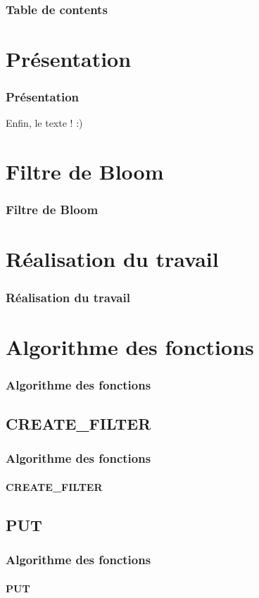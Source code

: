 \documentclass[hyperref={pdfpagemode=FullScreen,colorlinks=true},xcolor=pst,dvips]{beamer}\usepackage[french]{babel}
\title[]{\noindent\rule{\linewidth}{1pt}
		\large Recherche de filtres de Bloom similaires \\
		\large Application à la recherche par mots clés basée sur une DHT\\
		\noindent\rule{\linewidth}{1pt}
}
\author[NDOMBI TSHISUNGU \& DOAN]{\textbf{NDOMBI TSHISUNGU} Christian \& \textbf{DOAN} Cao Sang \\
			Encadrant: M. \textbf{MAKPANGOU} Mesaac, Regal}
\institute{UPMC}
\date{2 Mai 2015}
\begin{document}
	\begin{frame}
		\titlepage
	\end{frame}
	
	\begin{frame}
		\frametitle{Table de contents}
		\tableofcontents
	\end{frame}
	
	\section{Présentation}
	\begin{frame}
		\frametitle{Présentation}
		Enfin, le texte ! :)
	\end{frame}

	\section{Filtre de Bloom}
	\begin{frame}
		\frametitle{Filtre de Bloom}

	\end{frame}
	
	\section{Réalisation du travail}
	\begin{frame}
		\frametitle{Réalisation du travail}	
	
	\end{frame}
	
	\section{Algorithme des fonctions}
	\begin{frame}
		\frametitle{Algorithme des fonctions}
	\end{frame}
	
	\subsection{CREATE\_FILTER}
	\begin{frame}
		\frametitle{Algorithme des fonctions}
		\framesubtitle{CREATE\_FILTER}
	\end{frame}
	
	\subsection{PUT}
	\begin{frame}
		\frametitle{Algorithme des fonctions}
		\framesubtitle{PUT}
	\end{frame}
	
\end{document}
